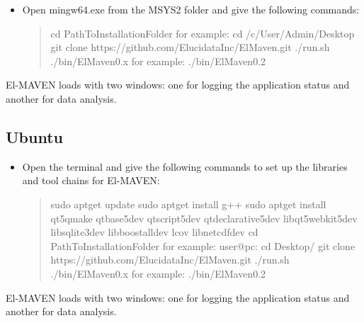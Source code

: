 \documentclass[letterpaper,10pt,english,openany,oneside]{sphinxmanual}
\begin{document}
\begin{itemize}
\item {} 
Open mingw64.exe from the MSYS2 folder and give the following commands:
\begin{quote}

%
\begin{sphinxVerbatim}[commandchars=\\\{\}]
\PYGZdl{} cd \PYGZlt{}PathToInstallationFolder\PYGZgt{} \PYGZsh{}for example: cd /c/User/Admin/Desktop
\PYGZdl{} git clone https://github.com/ElucidataInc/ElMaven.git
\PYGZdl{} ./run.sh
\PYGZdl{} ./bin/El\PYGZus{}Maven\PYGZus{}0.x \PYGZsh{}for example: ./bin/El\PYGZus{}Maven\PYGZus{}0.2
\end{sphinxVerbatim}
\end{quote}

\end{itemize}

El-MAVEN loads with two windows: one for logging the application status and another for data analysis.


\subsection{Ubuntu}
\label{\detokenize{Build:ubuntu}}\begin{itemize}
\item {} 
Open the terminal and give the following commands to set up the libraries and tool chains for El-MAVEN:
\begin{quote}

%
\begin{sphinxVerbatim}[commandchars=\\\{\}]
\PYGZdl{} sudo apt\PYGZhy{}get update
\PYGZdl{} sudo apt\PYGZhy{}get install g++
\PYGZdl{} sudo apt\PYGZhy{}get install qt5\PYGZhy{}qmake qtbase5\PYGZhy{}dev qtscript5\PYGZhy{}dev qtdeclarative5\PYGZhy{}dev libqt5webkit5\PYGZhy{}dev libsqlite3\PYGZhy{}dev libboost\PYGZhy{}all\PYGZhy{}dev lcov libnetcdf\PYGZhy{}dev
\PYGZdl{} cd \PYGZlt{}PathToInstallationFolder\PYGZgt{} \PYGZsh{}for example: user@pc:\PYGZti{}\PYGZdl{} cd Desktop/
\PYGZdl{} git clone https://github.com/ElucidataInc/ElMaven.git
\PYGZdl{} ./run.sh
\PYGZdl{} ./bin/El\PYGZus{}Maven\PYGZus{}0.x \PYGZsh{}for example: ./bin/El\PYGZus{}Maven\PYGZus{}0.2
\end{sphinxVerbatim}
\end{quote}

\end{itemize}

El-MAVEN loads with two windows: one for logging the application status and another for data analysis.
\end{document}

